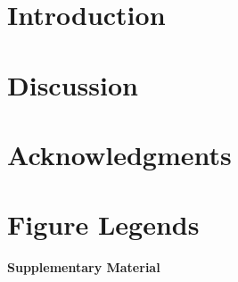 \section{Introduction}






\section{Discussion}


%

\section{Acknowledgments}




\pagebreak
 \section{Figure Legends}


\FloatBarrier

%
%
%
%


\pagebreak
\beginsupplement
\setcounter{secnumdepth}{4}
{\noindent\Large\bfseries Supplementary Material}

%
%

\FloatBarrier
\pagebreak

\pagebreak

\pagebreak

%
\pagebreak


\FloatBarrier
\pagebreak

% 


